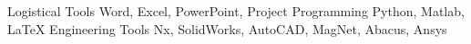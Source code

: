\vspace{-7mm}


\begin{cvskills}

\cvskill
{Logistical Tools}
{Word, Excel, PowerPoint, Project} %
\cvskill
{Programming} %
{Python, Matlab, LaTeX} %
\cvskill
{Engineering Tools} %
{Nx, SolidWorks, AutoCAD, MagNet, Abacus, Ansys} %

\end{cvskills}